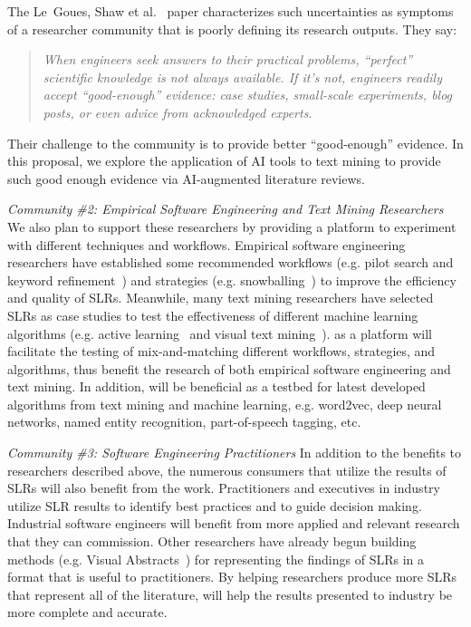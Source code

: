 The Le~Goues, Shaw et al.~\cite{Goues18} paper  characterizes such uncertainties
as symptoms of a researcher
  community that is poorly defining its research outputs. They say:
  \begin{quote}
  {\em When engineers seek answers to their practical problems, ``perfect'' scientific knowledge is not always available. If it's not, engineers readily accept ``good-enough'' evidence: case studies, small-scale experiments, blog posts, or even advice from acknowledged experts.}~\cite{Goues18} 
  \end{quote}
Their challenge to the community is to provide better ``good-enough'' evidence. In this proposal,
we explore the application of AI tools to text mining to provide such good enough evidence via AI-augmented literature reviews.
\item
{\em Community \#2:  Empirical Software Engineering and Text Mining Researchers}
We also plan to support these researchers by providing a platform to experiment  with  different techniques  and  workflows. Empirical software engineering researchers have established some recommended workflows (e.g. pilot search and keyword refinement~\cite{keele2007guidelines}) and strategies (e.g. snowballing~\cite{jalali2012systematic}) to improve the efficiency and quality of SLRs. Meanwhile, many text mining researchers have selected SLRs as case studies to test the effectiveness of different machine learning algorithms (e.g. active learning~\cite{Yu2018} and visual text mining~\cite{Felizardo2010An}). {\IT} as a platform will facilitate the testing of mix-and-matching different workflows, strategies, and algorithms, thus benefit the research of both empirical software engineering and text mining. In addition, {\IT} will be beneficial as a testbed for latest developed algorithms from text mining and machine learning, e.g. word2vec, deep neural networks, named entity recognition, part-of-speech tagging, etc.

\item {\em Community \#3: Software Engineering Practitioners}
In addition to the benefits to researchers described above, the numerous consumers that utilize the results of SLRs will also benefit from the work.  
Practitioners and executives in industry utilize SLR results to identify best practices and to guide decision making.  
Industrial software engineers will benefit from more applied and relevant research that they can commission.
Other researchers have already begun building methods (e.g. Visual Abstracts~\cite{VisualAbstracts}) for representing the findings of SLRs in a format that is useful to practitioners.
By helping researchers produce more SLRs that represent all of the literature, {\IT} will help the results presented to industry be more complete and accurate.
\ee
\ei
\vspace{8pt}